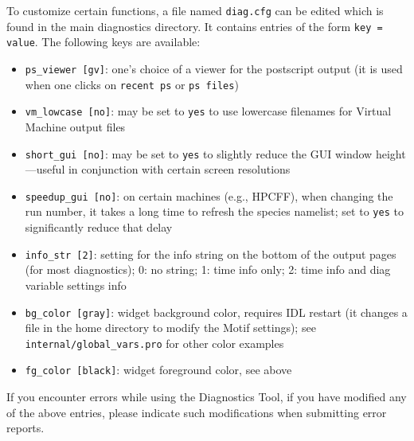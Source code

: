 \documentclass[12pt]{article}
\begin{document}
To customize certain functions, a file named \texttt{diag.cfg} can be
edited which is found in the main diagnostics directory. It contains
entries of the form \verb|key = value|. The following keys are
available:
\begin{itemize}
\item \texttt{ps\_viewer [gv]}: one's choice of a viewer for the
postscript output (it is used when one clicks on \verb|recent ps| or
\verb|ps files|)
\item \texttt{vm\_lowcase [no]}: may be set to \verb|yes| to use
lowercase filenames for Virtual Machine output files
\item \texttt{short\_gui [no]}: may be set to \verb|yes| to slightly
reduce the GUI window height---useful in conjunction with certain
screen resolutions
\item \texttt{speedup\_gui [no]}: on certain machines (e.g., HPCFF),
when changing the run number, it takes a long time to refresh the
species namelist; set to \verb|yes| to significantly reduce that delay
\item \texttt{info\_str [2]}: setting for the info string on the
bottom of the output pages (for most diagnostics); 0: no string; 1:
time info only; 2: time info and diag variable settings info
\item \texttt{bg\_color [gray]}: widget background color, requires IDL
restart (it changes a file in the home directory to modify the Motif
settings); see \texttt{internal/global\_vars.pro} for other color
examples
\item \texttt{fg\_color [black]}: widget foreground color, see above
\end{itemize}
If you encounter errors while using the \gene Diagnostics Tool, if you
have modified any of the above entries, please indicate such
modifications when submitting error reports.


\newpage
\end{document}
